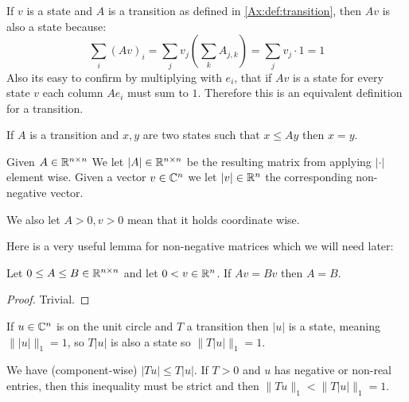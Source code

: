 \begin{remark}
\label{Ax:remark:state}
If $v$ is a
state and $A$ is a transition as defined in
\ref{Ax:def:transition}, then
  $Av$ is also a state because: 
$$\sum_i(Av)_i = \sum_j v_j(\sum_k A_{j,k}) = \sum_j v_j \cdot 1 = 1$$
Also its easy to confirm by multiplying with $e_i$, that if $Av$ is a state
for every state $v$ 
each column $A e_i$ must sum to $1$.
Therefore this is an equivalent definition for a transition.

If $A$ is a transition and $x,y$ are two states such that
$x \leq Ay$ then $x=y$.
\end{remark}

\begin{mydef}
\label{Ax:def:abs}
Given $A \in \mathbb{R}^{n \times n}$ We let $|A| \in \mathbb{R}^{n \times n}$ be the resulting
matrix from applying $|\cdot|$ element wise. Given a vector $v \in \mathbb{C}^n$ we let
$|v| \in \mathbb{R}^n$ the corresponding non-negative vector.

We also let $A \gt 0, v \gt 0$ mean that it holds coordinate wise. 
\end{mydef}

Here is a very useful lemma for non-negative matrices which we will need later:
\begin{lemma}
\label{Ax:lem:eqal_by_vector}
Let $0 \leq A \leq B \in \mathbb{R}^{n \times n}$ 
and let $0 < v \in \mathbb{R}^n$.
If $Av = Bv$ then $A = B$.
\begin{proof}
Trivial.
\end{proof}
\end{lemma}

\begin{remark}
\label{Ax:remark:abs}
If $u \in \mathbb{C}^n$ is on the unit circle and $T$ a transition then
$|u|$ is a state, meaning $\||u|\|_1=1$, so $T|u|$ is also a state 
so $\|T|u|\|_1=1$.

We have (component-wise) $|Tu| \leq T|u|$. If $T>0$ and $u$ has negative or
non-real entries, then this inequality must be strict and
then $\|Tu\|_1 \lt \|T|u|\|_1 = 1$.
\end{remark}

